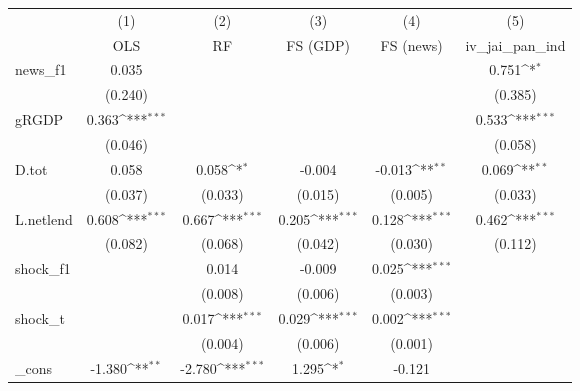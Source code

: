 {
\def\sym#1{\ifmmode^{#1}\else\(^{#1}\)\fi}
\begin{tabular}{l*{5}{c}}
\toprule
            &\multicolumn{1}{c}{(1)}&\multicolumn{1}{c}{(2)}&\multicolumn{1}{c}{(3)}&\multicolumn{1}{c}{(4)}&\multicolumn{1}{c}{(5)}\\
            &\multicolumn{1}{c}{OLS}&\multicolumn{1}{c}{RF}&\multicolumn{1}{c}{FS (GDP)}&\multicolumn{1}{c}{FS (news)}&\multicolumn{1}{c}{iv\_jai\_pan\_ind}\\
\midrule
news\_f1     &       0.035         &                     &                     &                     &       0.751\sym{*}  \\
            &     (0.240)         &                     &                     &                     &     (0.385)         \\
\addlinespace
gRGDP       &       0.363\sym{***}&                     &                     &                     &       0.533\sym{***}\\
            &     (0.046)         &                     &                     &                     &     (0.058)         \\
\addlinespace
D.tot       &       0.058         &       0.058\sym{*}  &      -0.004         &      -0.013\sym{**} &       0.069\sym{**} \\
            &     (0.037)         &     (0.033)         &     (0.015)         &     (0.005)         &     (0.033)         \\
\addlinespace
L.netlend   &       0.608\sym{***}&       0.667\sym{***}&       0.205\sym{***}&       0.128\sym{***}&       0.462\sym{***}\\
            &     (0.082)         &     (0.068)         &     (0.042)         &     (0.030)         &     (0.112)         \\
\addlinespace
shock\_f1    &                     &       0.014         &      -0.009         &       0.025\sym{***}&                     \\
            &                     &     (0.008)         &     (0.006)         &     (0.003)         &                     \\
\addlinespace
shock\_t     &                     &       0.017\sym{***}&       0.029\sym{***}&       0.002\sym{***}&                     \\
            &                     &     (0.004)         &     (0.006)         &     (0.001)         &                     \\
\addlinespace
\_cons      &      -1.380\sym{**} &      -2.780\sym{***}&       1.295\sym{*}  &      -0.121         &                     \\

\end{tabular}}
